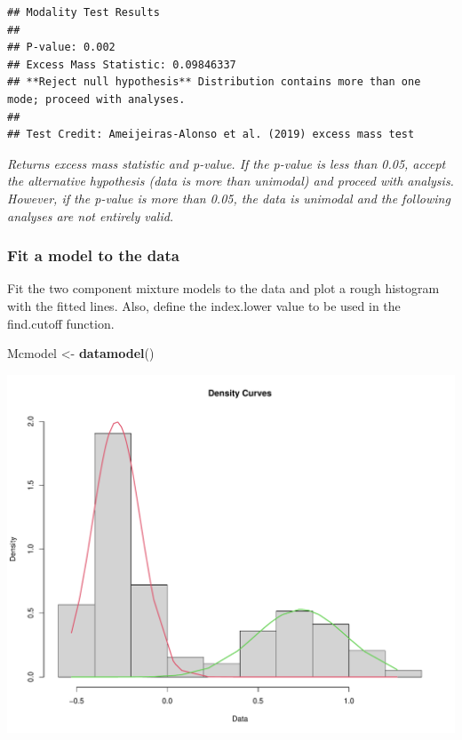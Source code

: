 \documentclass[
]{article}
\newenvironment{Shaded}{\begin{snugshade}}{\end{snugshade}}
\newcommand{\FunctionTok}[1]{\textcolor[rgb]{0.13,0.29,0.53}{\textbf{#1}}}
\newcommand{\NormalTok}[1]{#1}
\newcommand{\OtherTok}[1]{\textcolor[rgb]{0.56,0.35,0.01}{#1}}
\begin{document}
\begin{verbatim}
## Modality Test Results
## 
## P-value: 0.002 
## Excess Mass Statistic: 0.09846337 
## **Reject null hypothesis** Distribution contains more than one mode; proceed with analyses.
## 
## Test Credit: Ameijeiras-Alonso et al. (2019) excess mass test
\end{verbatim}

\emph{Returns excess mass statistic and p-value. If the p-value is less
than 0.05, accept the alternative hypothesis (data is more than
unimodal) and proceed with analysis. However, if the p-value is more
than 0.05, the data is unimodal and the following analyses are not
entirely valid.}

\subsubsection{Fit a model to the data}\label{fit-a-model-to-the-data}

Fit the two component mixture models to the data and plot a rough
histogram with the fitted lines. Also, define the index.lower value to
be used in the find.cutoff function.

\begin{Shaded}
\begin{Highlighting}[]
\NormalTok{Mcmodel }\OtherTok{\textless{}{-}} \FunctionTok{datamodel}\NormalTok{()}
\end{Highlighting}
\end{Shaded}

\begin{center}\includegraphics{man/cutoffvalue_figures/README-model-data-1} \end{center}
\end{document}
